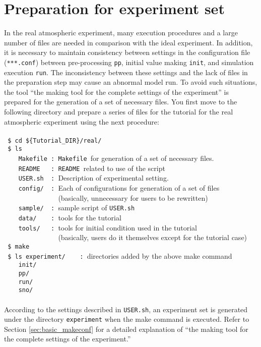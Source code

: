 \section{Preparation for experiment set} \label{sec:tutorial_real_prep}

In the real atmospheric experiment,
many execution procedures and a large number of files are needed in comparison with the ideal experiment.
In addition, it is necessary to maintain consistency between settings in the configuration file (\verb|***.conf|)
between pre-processing \verb|pp|, initial value making \verb|init|, and simulation execution \verb|run|.
The inconsistency between these settings and the lack of files in the preparation step may cause an abnormal model run.
To avoid such situations, the tool ``the making tool for the complete settings of the experiment''
is prepared for the generation of a set of necessary files.
You first move to the following directory and prepare a series of files for the tutorial for the real atmospheric experiment using the next procedure:\\
\\
\verb| $ cd ${Tutorial_DIR}/real/|\\
\verb| $ ls|\\
\verb|    Makefile : Makefile |for generation of a set of necessary files.\\
\verb|    README   : README |related to use of the script\\
\verb|    USER.sh  : |Description of experimental setting.\\
\verb|    config/  : |Each of configurations for generation of a set of files\\
\verb|               |(basically, unnecessary for users to be rewritten)\\
\verb|    sample/  : |sample script of \verb|USER.sh|\\
\verb|    data/    : |tools for the tutorial\\
\verb|    tools/   : |tools for initial condition used in the tutorial\\
\verb|               |(basically, users do it themselves except for the tutorial case)\\
\verb| $ make|\\
\verb| $ ls experiment/    : |directories added by the above make command\\
\verb|    init/|\\
\verb|    pp/|\\
\verb|    run/|\\
\verb|    sno/|\\
\\
According to the settings described in \verb|USER.sh|,
an experiment set is generated under the directory \verb|experiment| when the make command is executed.
Refer to Section \ref{sec:basic_makeconf} for a detailed explanation of ``the making tool for the complete settings of the experiment.''

